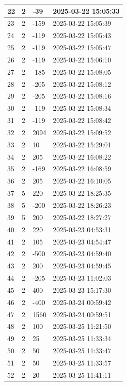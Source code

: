 \begin{longtable}{|l|l|l|l|}
22 & 2 & -39 & 2025-03-22 15:05:33 \\ \hline 
23 & 2 & -159 & 2025-03-22 15:05:39 \\ \hline 
24 & 2 & -119 & 2025-03-22 15:05:43 \\ \hline 
25 & 2 & -119 & 2025-03-22 15:05:47 \\ \hline 
26 & 2 & -119 & 2025-03-22 15:06:10 \\ \hline 
27 & 2 & -185 & 2025-03-22 15:08:05 \\ \hline 
28 & 2 & -205 & 2025-03-22 15:08:12 \\ \hline 
29 & 2 & -205 & 2025-03-22 15:08:16 \\ \hline 
30 & 2 & -119 & 2025-03-22 15:08:34 \\ \hline 
31 & 2 & -119 & 2025-03-22 15:08:42 \\ \hline 
32 & 2 & 2094 & 2025-03-22 15:09:52 \\ \hline 
33 & 2 & 10 & 2025-03-22 15:29:01 \\ \hline 
34 & 2 & 205 & 2025-03-22 16:08:22 \\ \hline 
35 & 2 & -169 & 2025-03-22 16:08:59 \\ \hline 
36 & 2 & 205 & 2025-03-22 16:10:05 \\ \hline 
37 & 5 & 220 & 2025-03-22 18:25:35 \\ \hline 
38 & 5 & -200 & 2025-03-22 18:26:23 \\ \hline 
39 & 5 & 200 & 2025-03-22 18:27:27 \\ \hline 
40 & 2 & 220 & 2025-03-23 04:53:31 \\ \hline 
41 & 2 & 105 & 2025-03-23 04:54:47 \\ \hline 
42 & 2 & -500 & 2025-03-23 04:59:40 \\ \hline 
43 & 2 & 200 & 2025-03-23 04:59:45 \\ \hline 
44 & 2 & -205 & 2025-03-23 11:02:03 \\ \hline 
45 & 2 & 400 & 2025-03-23 15:17:30 \\ \hline 
46 & 2 & -400 & 2025-03-24 00:59:42 \\ \hline 
47 & 2 & 1560 & 2025-03-24 00:59:51 \\ \hline 
48 & 2 & 100 & 2025-03-25 11:21:50 \\ \hline 
49 & 2 & 25 & 2025-03-25 11:33:34 \\ \hline 
50 & 2 & 50 & 2025-03-25 11:33:47 \\ \hline 
51 & 2 & 50 & 2025-03-25 11:33:57 \\ \hline 
52 & 2 & 20 & 2025-03-25 11:41:11 \\ \hline 

\end{longtable}
